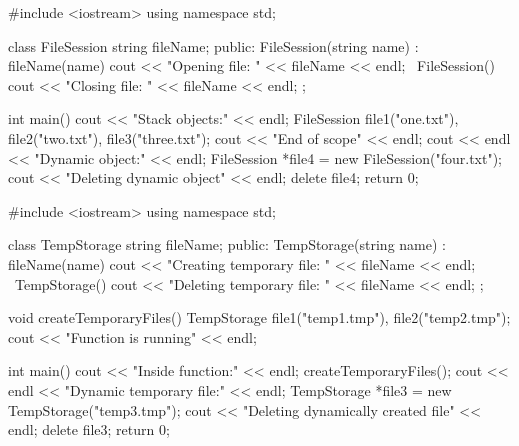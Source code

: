 \codelabel

\begin{code}
#include <iostream>
using namespace std;

class FileSession {
    string fileName;
public:
    FileSession(string name) : fileName(name) { cout << "Opening file: " << fileName << endl; }
    ~FileSession() { cout << "Closing file: " << fileName << endl; }
};

int main() {
    cout << "Stack objects:" << endl;
    {
        FileSession file1("one.txt"), file2("two.txt"), file3("three.txt");
        cout << "End of scope" << endl;
    }
    cout << endl << "Dynamic object:" << endl;
    FileSession *file4 = new FileSession("four.txt");
    cout << "Deleting dynamic object" << endl;
    delete file4;
    return 0;
}
\end{code}

\outputlabel
{}


\codelabel

\begin{code}
#include <iostream>
using namespace std;

class TempStorage {
    string fileName;
public:
    TempStorage(string name) : fileName(name) { cout << "Creating temporary file: " << fileName << endl; }
    ~TempStorage() { cout << "Deleting temporary file: " << fileName << endl; }
};

void createTemporaryFiles() {
    TempStorage file1("temp1.tmp"), file2("temp2.tmp");
    cout << "Function is running" << endl;
}

int main() {
    cout << "Inside function:" << endl;
    createTemporaryFiles();
    cout << endl << "Dynamic temporary file:" << endl;
    TempStorage *file3 = new TempStorage("temp3.tmp");
    cout << "Deleting dynamically created file" << endl;
    delete file3;
    return 0;
}
\end{code}

\outputlabel
{}

